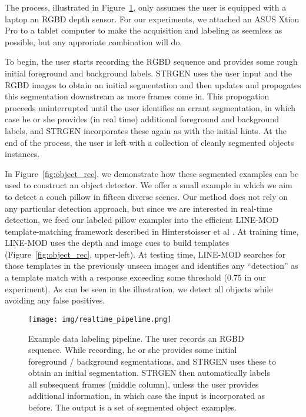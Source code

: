 \documentclass[graybox]{svmult}
\begin{document}
The process, illustrated in Figure~\ref{fig:data_labeling}, only assumes the user is equipped with a laptop an RGBD depth sensor.  For our experiments, we attached an ASUS Xtion Pro to a tablet computer to make the acquisition and labeling as seemless as possible, but any approriate combination will do.

To begin, the user starts recording the RGBD sequence and provides some rough initial foreground and background labels. STRGEN uses the user input and the RGBD images to obtain an initial segmentation and then updates and propogates this segmentation downstream as more frames come in.  This propogation proceeds uninterrupted until the user identifies an errant segmentation, in which case he or she provides (in real time) additional foreground and background labels, and STRGEN incorporates these again as with the initial hints.  At the end of the process, the user is left with a collection of cleanly segmented objects instances.

In Figure~\ref{fig:object_rec}, we demonstrate how these segmented examples can be used to construct an object detector.  We offer a small example in which we aim to detect a couch pillow in fifteen diverse scenes. Our method does not rely on any particular detection approach, but since we are interested in real-time detection, we feed our labeled pillow examples into the efficient LINE-MOD template-matching framework described in Hinterstoisser et al \cite{hinterstoisser2011a}. At training time, LINE-MOD uses the depth and image cues to build templates (Figure~\ref{fig:object_rec}, upper-left). At testing time, LINE-MOD searches for those templates in the previously unseen images and identifies any ``detection'' as a template match with a response exceeding some threshold (0.75 in our experiment).  As can be seen in the illustration, we detect all objects while avoiding any false positives.


\begin{figure}
\centering
        \texttt{[image: img/realtime\_pipeline.png]}
\caption{\small{Example data labeling pipeline. The user records an RGBD sequence.  While recording, he or she provides some initial foreground / background segmentations, and STRGEN uses these to obtain an initial segmentation.  STRGEN then automatically labels all subsequent frames (middle column), unless the user provides additional information, in which case the input is incorporated as before.  The output is a set of segmented object examples. }}
\label{fig:data_labeling}
\end{figure}
\end{document}
